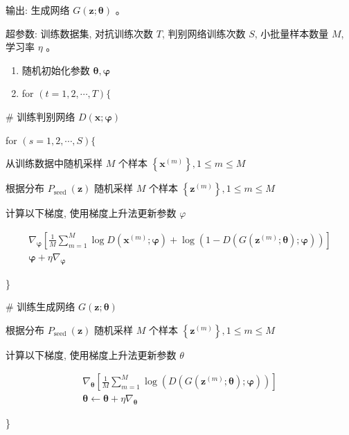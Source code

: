 \documentclass[10pt]{article}
\begin{document}
输出: 生成网络 $G(\boldsymbol{z} ; \boldsymbol{\theta})$ 。

超参数: 训练数据集, 对抗训练次数 $T$, 判别网络训练次数 $S$, 小批量样本数量 $M$, 学习率 $\eta$ 。

\begin{enumerate}
  \item 随机初始化参数 $\boldsymbol{\theta}, \boldsymbol{\varphi}$

  \item for $(t=1,2, \cdots, T)\{$

\end{enumerate}

\# 训练判别网络 $D(\boldsymbol{x} ; \boldsymbol{\varphi})$

for $(s=1,2, \cdots, S)\{$

从训练数据中随机采样 $M$ 个样本 $\left\{\boldsymbol{x}^{(m)}\right\}, 1 \leqslant m \leqslant M$

根据分布 $P_{\text {seed }}(\boldsymbol{z})$ 随机采样 $M$ 个样本 $\left\{\boldsymbol{z}^{(m)}\right\}, 1 \leqslant m \leqslant M$

计算以下梯度, 使用梯度上升法更新参数 $\varphi$

$$
\begin{gathered}
\nabla_{\boldsymbol{\varphi}}\left[\frac{1}{M} \sum_{m=1}^{M} \log D\left(\boldsymbol{x}^{(m)} ; \boldsymbol{\varphi}\right)+\log \left(1-D\left(G\left(\boldsymbol{z}^{(m)} ; \boldsymbol{\theta}\right) ; \boldsymbol{\varphi}\right)\right)\right] \\
\boldsymbol{\varphi}+\eta \nabla_{\boldsymbol{\varphi}}
\end{gathered}
$$

\}

\# 训练生成网络 $G(\boldsymbol{z} ; \boldsymbol{\theta})$

根据分布 $P_{\text {seed }}(\boldsymbol{z})$ 随机采样 $M$ 个样本 $\left\{\boldsymbol{z}^{(m)}\right\}, 1 \leqslant m \leqslant M$

计算以下梯度, 使用梯度上升法更新参数 $\theta$

$$
\begin{gathered}
\nabla_{\boldsymbol{\theta}}\left[\frac{1}{M} \sum_{m=1}^{M} \log \left(D\left(G\left(\boldsymbol{z}^{(m)} ; \boldsymbol{\theta}\right) ; \boldsymbol{\varphi}\right)\right)\right] \\
\boldsymbol{\theta} \leftarrow \boldsymbol{\theta}+\eta \nabla_{\boldsymbol{\theta}}
\end{gathered}
$$

\}
\end{document}
